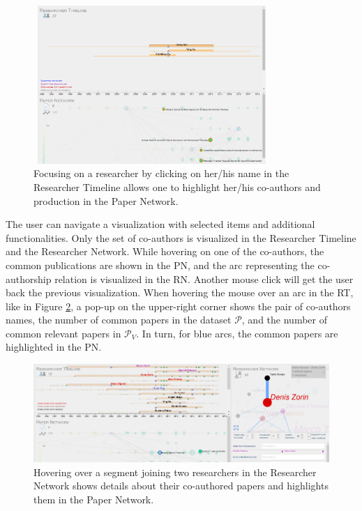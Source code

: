 \begin{figure}[!ht]
    \centering
    \includegraphics[width=0.8\textwidth, height=6cm]{fig/timeline_researcherhover_cropped.png}
    \caption{Focusing on a researcher by clicking on her/his name in the Researcher Timeline allows one to highlight her/his co-authors and production in the Paper Network.}%
    \label{fig:authorclick}
\end{figure}

The user can navigate a visualization with selected items and additional functionalities. Only the set of co-authors is visualized in the Researcher Timeline and the Researcher Network. While hovering on one of the co-authors, the common publications are shown in the PN, and the arc representing the co-authorship relation is visualized in the RN. Another mouse click will get the user back the previous visualization.
When hovering the mouse over an arc in the RT, like in Figure \ref{fig:researchernetwork}, a pop-up on the upper-right corner shows the pair of co-authors names, the number of common papers in the dataset $\mathcal{P}$, and the number of common relevant papers in $\mathcal{P}_{V}$. In turn, for blue arcs, the common papers are highlighted in the PN. 

\begin{figure}[!ht]
    \centering
    \includegraphics[width=\textwidth]{fig/researchernetwork.png}
    \caption{Hovering over a segment joining two researchers in the Researcher Network shows details about their co-authored papers and highlights them in the Paper Network.}
    \label{fig:researchernetwork}
    \end{figure}

